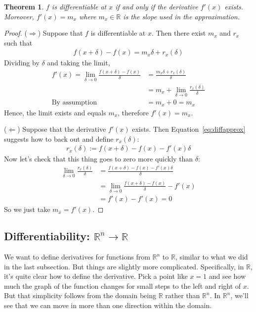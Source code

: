 \documentclass[12pt]{article}
\numberwithin{equation}{section} %
\theoremstyle{plain}
\newtheorem{thm}{Theorem}[section]
\theoremstyle{definition}
\theoremstyle{remark}
\newcommand{\R}{\mathbb{R}}
\newcommand{\Rn}{\mathbb{R}^n}
\begin{document}
\begin{thm}
$f$ is differentiable at $x$ if and only if the derivative $f'(x)$
exists. Moreover, $f'(x)=m_x$ where $m_x\in\R$ is the slope used in the
approximation.
\end{thm}
\begin{proof}
($\Rightarrow$) Suppose that $f$ is differentiable at $x$. Then there
exist $m_x$ and $r_x$ such that
\begin{align*}
  f(x+\delta)-f(x) = m_x\delta + r_x(\delta)
\end{align*}
Dividing by $\delta$ and taking the limit,
\begin{align*}
  f'(x)=\lim_{\delta\rightarrow 0}
  \frac{f(x+\delta)-f(x)}{\delta}
  &= \frac{m_x\delta + r_x(\delta)}{\delta}\\
  &= m_x + \lim_{\delta\rightarrow 0} \frac{r_x(\delta)}{\delta}\\
  \text{By assumption}\quad
  &= m_x + 0 = m_x
\end{align*}
Hence, the limit exists and equals $m_x$, therefore $f'(x)=m_x$.


($\Leftarrow$) Suppose that the derivative $f'(x)$ exists.  Then
Equation~\ref{eq:diffapprox} suggests how to back out and define
$r_x(\delta)$:
\begin{align*}
  r_x(\delta) := f(x+\delta)-f(x) - f'(x)\delta
\end{align*}
Now let's check that this thing goes to zero more quickly than $\delta$:
\begin{align*}
  \lim_{\delta\rightarrow 0}
  \frac{r_x(\delta)}{\delta}
  &=
  \frac{f(x+\delta)-f(x) - f'(x)\delta}{\delta}\\
  &=
  \lim_{\delta\rightarrow 0}
  \frac{f(x+\delta)-f(x)}{\delta}
  -f'(x) \\
  &= f'(x) -f'(x)=0
\end{align*}
So we just take $m_x=f'(x)$.
\end{proof}

\subsection{Differentiability: $\Rn\rightarrow\R$}


We want to define derivatives for functions from $\Rn$ to $\R$, similar
to what we did in the last subsection. But things are slightly more
complicated.  Specifically, in $\R$, it's quite clear how to define the
derivative. Pick a point like $x=1$ and see how much the graph of the
function changes for small steps to the left and right of $x$. But that
simplicity follows from the domain being $\R$ rather than $\Rn$. In
$\Rn$, we'll see that we can move in more than one direction within the
domain.
\end{document}
